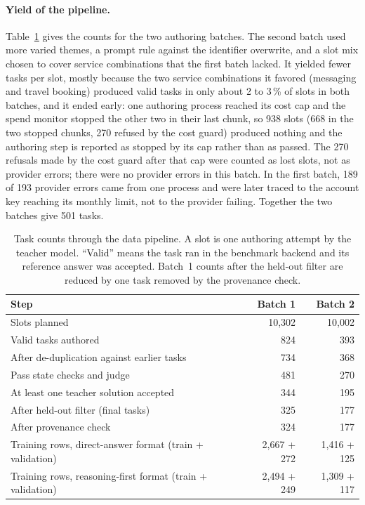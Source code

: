\paragraph{Yield of the pipeline.} Table~\ref{tab:distill-funnel} gives the counts for the two authoring batches. The second batch used more varied themes, a prompt rule against the identifier overwrite, and a slot mix chosen to cover service combinations that the first batch lacked. It yielded fewer tasks per slot, mostly because the two service combinations it favored (messaging and travel booking) produced valid tasks in only about 2 to 3\,\% of slots in both batches, and it ended early: one authoring process reached its cost cap and the spend monitor stopped the other two in their last chunk, so 938 slots (668 in the two stopped chunks, 270 refused by the cost guard) produced nothing and the authoring step is reported as stopped by its cap rather than as passed. The 270 refusals made by the cost guard after that cap were counted as lost slots, not as provider errors; there were no provider errors in this batch. In the first batch, 189 of 193 provider errors came from one process and were later traced to the account key reaching its monthly limit, not to the provider failing. Together the two batches give 501 tasks. %
\begin{table}[!htbp]
\centering
\caption{Task counts through the data pipeline. A slot is one authoring attempt by the teacher model. ``Valid'' means the task ran in the benchmark backend and its reference answer was accepted. Batch~1 counts after the held-out filter are reduced by one task removed by the provenance check.}
\label{tab:distill-funnel}
\begin{tabular}{@{}lrr@{}}
\toprule
Step & Batch 1 & Batch 2 \\
\midrule
Slots planned & 10{,}302 & 10{,}002 \\
Valid tasks authored & 824 & 393 \\
After de-duplication against earlier tasks & 734 & 368 \\
Pass state checks and judge & 481 & 270 \\
At least one teacher solution accepted & 344 & 195 \\
After held-out filter (final tasks) & 325 & 177 \\
After provenance check & 324 & 177 \\
\midrule
Training rows, direct-answer format (train + validation) & 2{,}667 + 272 & 1{,}416 + 125 \\
Training rows, reasoning-first format (train + validation) & 2{,}494 + 249 & 1{,}309 + 117 \\
\bottomrule
\end{tabular}
\end{table}
